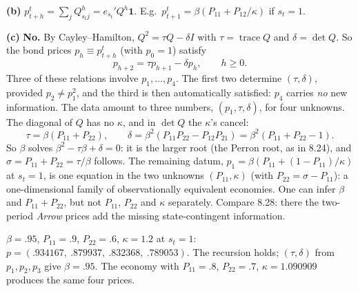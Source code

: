 \documentclass[12pt, letterpaper]{article}
\newcommand{\tr}{\operatorname{trace}}
\begin{document}
\begin{tcolorbox}[evenbox,title={Exercise 8.26 \quad Recovering probabilities from prices, III}]
\textbf{(b)} $p^t_{t+h}=\sum_jQ^h_{s_tj}=e_{s_t}'Q^h\mathbf 1$. E.g.\ $p^t_{t+1}=\beta(P_{11}+P_{12}/\kappa)$ if $s_t=1$.

\textbf{(c)} \textbf{No.} By Cayley--Hamilton, $Q^2=\tau Q-\delta I$ with $\tau=\tr Q$ and $\delta=\det Q$. So the bond prices
$p_h\equiv p^t_{t+h}$ (with $p_0=1$) satisfy
\[
p_{h+2}=\tau p_{h+1}-\delta p_h,\qquad h\ge0 .
\]
Three of these relations involve $p_1,\dots,p_4$. The first two determine $(\tau,\delta)$, provided $p_2\ne p_1^2$, and
the third is then automatically satisfied: $p_4$ carries \emph{no} new information. The data amount to three numbers,
$(p_1,\tau,\delta)$, for four unknowns. The diagonal of $Q$ has no $\kappa$, and in $\det Q$ the $\kappa$'s cancel:
\[
\tau=\beta(P_{11}+P_{22}),\qquad\delta=\beta^2(P_{11}P_{22}-P_{12}P_{21})=\beta^2(P_{11}+P_{22}-1).
\]
So $\beta$ solves $\beta^2-\tau\beta+\delta=0$: it is the larger root (the Perron root, as in 8.24), and $\sigma=P_{11}+P_{22}=\tau/\beta$
follows. The remaining datum, $p_1=\beta(P_{11}+(1-P_{11})/\kappa)$ at $s_t=1$, is one equation in the two unknowns
$(P_{11},\kappa)$ (with $P_{22}=\sigma-P_{11}$): a one-dimensional family of observationally equivalent economies.
One can infer $\beta$ and $P_{11}+P_{22}$, but not $P_{11}$, $P_{22}$ and $\kappa$ separately. Compare 8.28: there the
two-period \emph{Arrow} prices add the missing state-contingent information.

\begin{tcolorbox}[databox]
$\beta=.95$, $P_{11}=.9$, $P_{22}=.6$, $\kappa=1.2$ at $s_t=1$: $p=(.934167,\ .879937,\ .832368,\ .789053)$. The recursion holds;
$(\tau,\delta)$ from $p_1,p_2,p_3$ give $\beta=.95$. The economy with $P_{11}=.8$, $P_{22}=.7$, $\kappa=1.090909$ produces
the same four prices.
\end{tcolorbox}
\end{tcolorbox}
\end{document}
